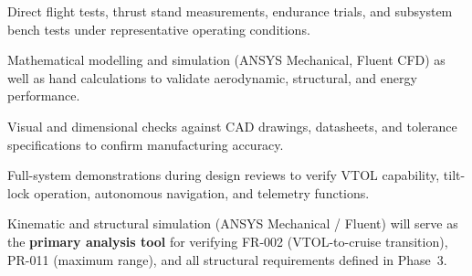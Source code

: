 \begin{description}[noitemsep]
    \item[Test (T):] Direct flight tests, thrust stand measurements, endurance trials, and subsystem bench tests under representative operating conditions.
    \item[Analysis (A):] Mathematical modelling and simulation (ANSYS Mechanical, Fluent CFD) as well as hand calculations to validate aerodynamic, structural, and energy performance.
    \item[Inspection (I):] Visual and dimensional checks against CAD drawings, datasheets, and tolerance specifications to confirm manufacturing accuracy.
    \item[Demonstration (D):] Full-system demonstrations during design reviews to verify VTOL capability, tilt-lock operation, autonomous navigation, and telemetry functions.
\end{description}

Kinematic and structural simulation (ANSYS Mechanical / Fluent) will serve as the \textbf{primary analysis tool} for verifying FR-002 (VTOL-to-cruise transition), PR-011 (maximum range), and all structural requirements defined in Phase~3.
